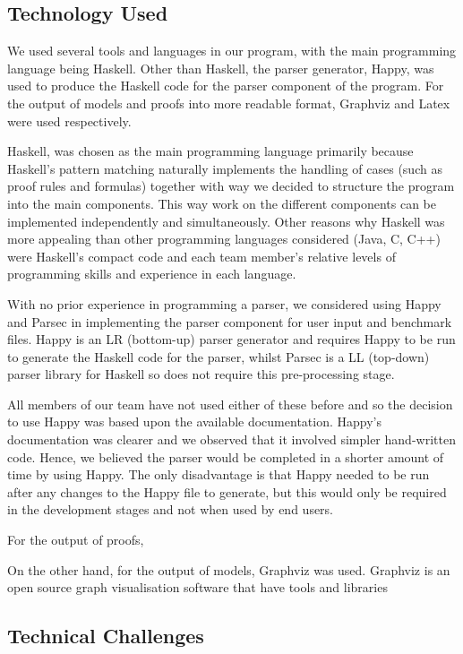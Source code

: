 \subsection{Technology Used}

We used several tools and languages in our program, with the main programming language being Haskell. Other than Haskell, the parser generator, Happy, was used to produce the Haskell code for the parser component of the program. For the output of models and proofs into more readable format, Graphviz and Latex were used respectively.

Haskell, was chosen as the main programming language primarily because Haskell's pattern matching naturally implements the handling of cases (such as proof rules and formulas) together with way we decided to structure the program into the main components. This way work on the different components can be implemented independently and simultaneously. Other reasons why Haskell was more appealing than other programming languages considered (Java, C, C++) were Haskell's compact code and each team member's relative levels of programming skills and experience in each language.

With no prior experience in programming a parser, we considered using Happy and Parsec in implementing the parser component for user input and benchmark files. Happy is an LR (bottom-up) parser generator and requires Happy to be run to generate the Haskell code for the parser, whilst Parsec is a LL (top-down) parser library for Haskell so does not require this pre-processing stage.

All members of our team have not used either of these before and so the decision to use Happy was based upon the available documentation. Happy's documentation was clearer and we observed that it involved simpler hand-written code. Hence, we believed the parser would be completed in a shorter amount of time by using Happy. The only disadvantage is that Happy needed to be run after any changes to the Happy file to generate, but this would only be required in the development stages and not when used by end users.

For the output of proofs, 

On the other hand, for the output of models, Graphviz was used. Graphviz is an open source graph visualisation software that have tools and libraries

\subsection{Technical Challenges}

